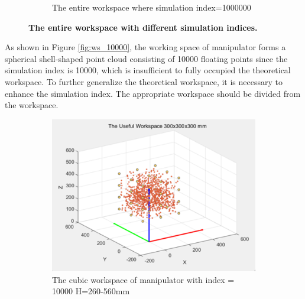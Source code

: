 \begin{figure}[H]
\begin{subfigure}{0.45\textwidth}
        \caption{\centering The entire workspace where simulation index=1000000}
        \label{fig:ws_1000000}
    \end{subfigure}
    \caption[The entire workspace with different random indices]
    {\centering \textbf{The entire workspace with different simulation indices.}}
    \label{fig:ws_diff}
\end{figure}
\noindent As shown in Figure \ref{fig:ws_10000}, the working space of manipulator forms a spherical shell-shaped point 
cloud consisting of 10000 floating points since the simulation index is 10000, which is insufficient to fully 
occupied the theoretical workspace. To further generalize the theoretical workspace, it is necessary to enhance 
the simulation index. The appropriate workspace should be divided from the workspace. 
\begin{figure}[H] %
    \centering %
    \captionsetup{labelsep=colon}
    \begin{subfigure}{0.45\textwidth} %
        \centering
        \includegraphics[width=\linewidth]{Image/Result/rect_workspace_10000_260-560.png}
        \caption{\centering The cubic workspace of manipulator with index = 10000 H=260-560mm}
        \label{fig:ws_10000_260}
    \end{subfigure}
    \hfill
    \begin{subfigure}{0.45\textwidth} %
        \centering

\end{subfigure}
\end{figure}
